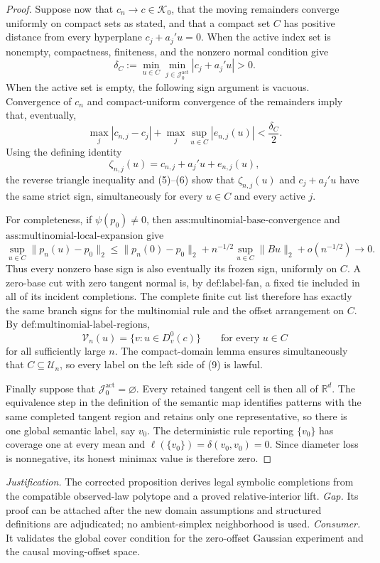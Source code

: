\documentclass{article}
\begin{document}
\begin{proof}
Suppose now that \(c_n\to c\in\mathcal K_0\), that the moving
remainders converge uniformly on compact sets as stated, and that a
compact set \(C\) has positive distance from every hyperplane
\(c_j+a_j'u=0\).  When the active index set is nonempty, compactness,
finiteness, and the nonzero normal condition give
\[
 \delta_C
 :=\min_{u\in C}\min_{j\in\mathcal J_0^{\mathrm{act}}}
       |c_j+a_j'u|>0.
\tag{5}
\]
When the active set is empty, the following sign argument is vacuous.
Convergence of \(c_n\) and compact-uniform convergence of the
remainders imply that, eventually,
\[
 \max_j|c_{n,j}-c_j|
 +\max_j\sup_{u\in C}|e_{n,j}(u)|
 <\frac{\delta_C}{2}.
\tag{6}
\]
Using the defining identity
\[
 \zeta_{n,j}(u)=c_{n,j}+a_j'u+e_{n,j}(u),
\tag{7}
\]
the reverse triangle inequality and (5)--(6) show that
\(\zeta_{n,j}(u)\) and \(c_j+a_j'u\) have the same strict sign,
simultaneously for every \(u\in C\) and every active \(j\).

For completeness, if \(\psi(p_0)\ne0\), then
\(\text{ass:multinomial-base-convergence}\) and
\(\text{ass:multinomial-local-expansion}\) give
\[
 \sup_{u\in C}\|p_n(u)-p_0\|_2
 \leq \|p_n(0)-p_0\|_2
 +n^{-1/2}\sup_{u\in C}\|Bu\|_2+o(n^{-1/2})
 \longrightarrow0.
\tag{8}
\]
Thus every nonzero base sign is also eventually its frozen sign,
uniformly on \(C\).  A zero-base cut with zero tangent normal is, by
\(\text{def:label-fan}\), a fixed tie included in all of its incident
completions.  The complete finite cut list therefore has exactly the
same branch signs for the multinomial rule and the offset arrangement
on \(C\).  By \(\text{def:multinomial-label-regions}\),
\[
 \mathcal V_n(u)=\{v:u\in D_v^0(c)\}
 \qquad\text{for every \(u\in C\)}
\tag{9}
\]
for all sufficiently large \(n\).  The compact-domain lemma ensures
simultaneously that \(C\subseteq\mathcal U_n\), so every label on the
left side of (9) is lawful.

Finally suppose that
\(\mathcal J_0^{\mathrm{act}}=\varnothing\).  Every retained tangent
cell is then all of \(\mathbb R^d\).  The equivalence step in the
definition of the semantic map identifies patterns with the same
completed tangent region and retains only one representative, so there
is one global semantic label, say \(v_0\).  The deterministic rule
reporting \(\{v_0\}\) has coverage one at every mean and
\(\ell(\{v_0\})=\delta(v_0,v_0)=0\).  Since diameter loss is
nonnegative, its honest minimax value is therefore zero.
\end{proof}
\par\smallskip\noindent \textit{Justification.} The corrected proposition derives legal symbolic completions from the compatible observed-law polytope and a proved relative-interior lift. \textit{Gap.} Its proof can be attached after the new domain assumptions and structured definitions are adjudicated; no ambient-simplex neighborhood is used. \textit{Consumer.} It validates the global cover condition for the zero-offset Gaussian experiment and the causal moving-offset space.
\end{document}
